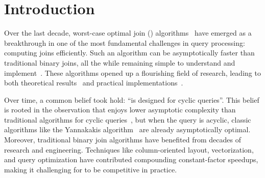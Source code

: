 \section{Introduction}\label{sec:intro}

Over the last decade, worst-case optimal join (\WCOJ)
algorithms~\cite{DBLP:conf/pods/NgoPRR12, DBLP:conf/icdt/Veldhuizen14,
  DBLP:journals/sigmod/NgoRR13, DBLP:conf/pods/000118} have emerged as
a breakthrough in one of the most fundamental challenges in query
processing: computing joins efficiently.  Such an algorithm can be
asymptotically faster than traditional binary joins, all the while
remaining simple to understand and
implement~\cite{DBLP:journals/sigmod/NgoRR13}.  These algorithms
opened up a flourishing field of research, leading to both theoretical
results~\cite{DBLP:journals/sigmod/NgoRR13,DBLP:conf/pods/Khamis0S17}
and practical
implementations~\cite{DBLP:conf/icdt/Veldhuizen14,DBLP:journals/tods/AbergerLTNOR17,DBLP:journals/pvldb/FreitagBSKN20, DBLP:journals/pvldb/MhedhbiS19}.

Over time, a common belief took hold:
``\WCOJ is designed for cyclic queries''.
This belief is rooted in the observation that
\WCOJ enjoys lower asymptotic complexity
than traditional algorithms for cyclic queries~\cite{DBLP:journals/sigmod/NgoRR13},
but when the query is acyclic,
classic algorithms like the Yannakakis algorithm~\cite{DBLP:conf/vldb/Yannakakis81}
are already asymptotically optimal.
Moreover, traditional binary join algorithms have benefited from
decades of research and engineering.
Techniques like column-oriented layout, vectorization,
and query optimization
have contributed compounding constant-factor speedups,
making it challenging for \WCOJ to be competitive in practice.

